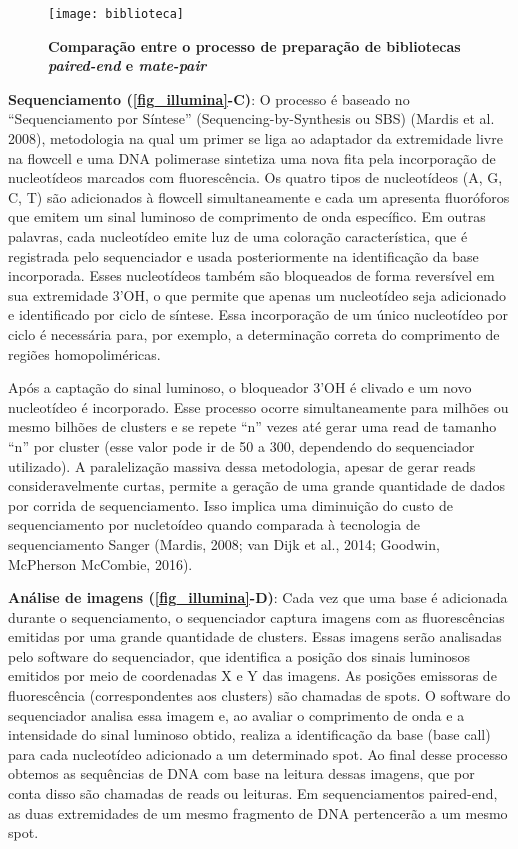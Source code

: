 \documentclass[../DISSERTACAO_MAIN.tex]{subfiles}
\begin{document}
\begin{figure}[htb]
	\texttt{[image: biblioteca]}
	\caption[Preparação de bibliotecas \textit{paired-end} and \textit{mate-pair}]{\textbf{Comparação entre o processo de preparação de bibliotecas \textit{paired-end} e \textit{mate-pair}}}
	\label{fig_biblioteca}
\end{figure}

\textbf{Sequenciamento (\autoref{fig_illumina}-C)}: O processo é baseado no “Sequenciamento por Síntese” (Sequencing-by-Synthesis ou SBS) (Mardis et al. 2008), metodologia na qual um primer se liga ao adaptador da extremidade livre na flowcell e uma DNA polimerase sintetiza uma nova fita pela incorporação de nucleotídeos marcados com fluorescência. Os quatro tipos de nucleotídeos (A, G, C, T) são adicionados à flowcell simultaneamente e cada um apresenta fluoróforos que emitem um sinal luminoso de comprimento de onda específico. Em outras palavras, cada nucleotídeo emite luz de uma coloração característica, que é registrada pelo sequenciador e usada posteriormente na identificação da base incorporada. Esses nucleotídeos também são bloqueados de forma reversível em sua extremidade 3’OH, o que permite que apenas um nucleotídeo seja adicionado e identificado por ciclo de síntese. Essa incorporação de um único nucleotídeo por ciclo é necessária para, por exemplo, a determinação correta do comprimento de regiões homopoliméricas. 

Após a captação do sinal luminoso, o bloqueador 3’OH é clivado e um novo nucleotídeo é incorporado. Esse processo ocorre simultaneamente para milhões ou mesmo bilhões de clusters e se repete “n” vezes até gerar uma read de tamanho “n” por cluster (esse valor pode ir de 50 a 300, dependendo do sequenciador utilizado). A paralelização massiva dessa metodologia, apesar de gerar reads consideravelmente curtas, permite a geração de uma grande quantidade de dados por corrida de sequenciamento. Isso implica uma diminuição do custo de sequenciamento por nucletoídeo quando comparada à tecnologia de sequenciamento Sanger (Mardis, 2008; van Dijk et al., 2014; Goodwin, McPherson  McCombie, 2016).

\textbf{Análise de imagens (\autoref{fig_illumina}-D)}: Cada vez que uma base é adicionada durante o sequenciamento, o sequenciador captura imagens com as fluorescências emitidas por uma grande quantidade de clusters. Essas imagens serão analisadas pelo software do sequenciador, que identifica a posição dos sinais luminosos emitidos por meio de coordenadas X e Y das imagens. As posições emissoras de fluorescência (correspondentes aos clusters) são chamadas de spots. O software do sequenciador analisa essa imagem e, ao avaliar o comprimento de onda e a intensidade do sinal luminoso obtido, realiza a identificação da base (base call) para cada nucleotídeo adicionado a um determinado spot. Ao final desse processo obtemos as sequências de DNA com base na leitura dessas imagens, que por conta disso são chamadas de reads ou leituras. Em sequenciamentos paired-end, as duas extremidades de um mesmo fragmento de DNA pertencerão a um mesmo spot.
\end{document}

